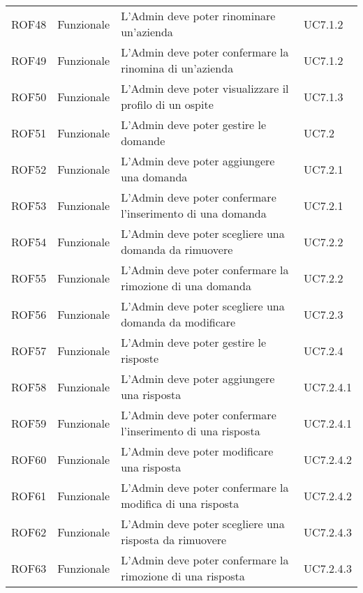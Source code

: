 \documentclass[../AnalisiDeiRequisiti.tex]{subfiles}
\begin{document}
\begin{longtable}{p{2.5cm}!{\VRule[1pt]}p{2.5cm}!{\VRule[1pt]}p{5cm}!{\VRule[1pt]}p{2.5cm}}
	ROF48&Funzionale\newline  & L'Admin deve poter rinominare un'azienda & UC7.1.2 \\
	ROF49&Funzionale\newline  & L'Admin deve poter confermare la rinomina di un'azienda & UC7.1.2 \\
	ROF50&Funzionale\newline  & L'Admin deve poter visualizzare il profilo di un ospite & UC7.1.3 \\
	ROF51&Funzionale\newline  & L'Admin deve poter gestire le domande & UC7.2 \\
	ROF52&Funzionale\newline  & L'Admin deve poter aggiungere una domanda & UC7.2.1 \\
	ROF53&Funzionale\newline  & L'Admin deve poter confermare l'inserimento di una domanda & UC7.2.1 \\
	ROF54&Funzionale\newline  & L'Admin deve poter scegliere una domanda da rimuovere & UC7.2.2 \\
	ROF55&Funzionale\newline  & L'Admin deve poter confermare la rimozione di una domanda & UC7.2.2 \\
	ROF56&Funzionale\newline  & L'Admin deve poter scegliere una domanda da modificare & UC7.2.3 \\
	ROF57&Funzionale\newline  & L'Admin deve poter gestire le risposte & UC7.2.4 \\
	ROF58&Funzionale\newline  & L'Admin deve poter aggiungere una risposta & UC7.2.4.1 \\
	ROF59&Funzionale\newline  & L'Admin deve poter confermare l'inserimento di una risposta & UC7.2.4.1 \\
	ROF60&Funzionale\newline  & L'Admin deve poter modificare una risposta & UC7.2.4.2 \\
	ROF61&Funzionale\newline  & L'Admin deve poter confermare la modifica di una risposta & UC7.2.4.2 \\
	ROF62&Funzionale\newline  & L'Admin deve poter scegliere una risposta da rimuovere & UC7.2.4.3 \\
	ROF63&Funzionale\newline  & L'Admin deve poter confermare la rimozione di una risposta & UC7.2.4.3 \\

\end{longtable}
\end{document}
